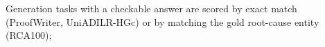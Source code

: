 

Generation tasks with a checkable answer are scored by exact match (ProofWriter, UniADILR-HGc) or by matching the gold root-cause entity (RCA100);






